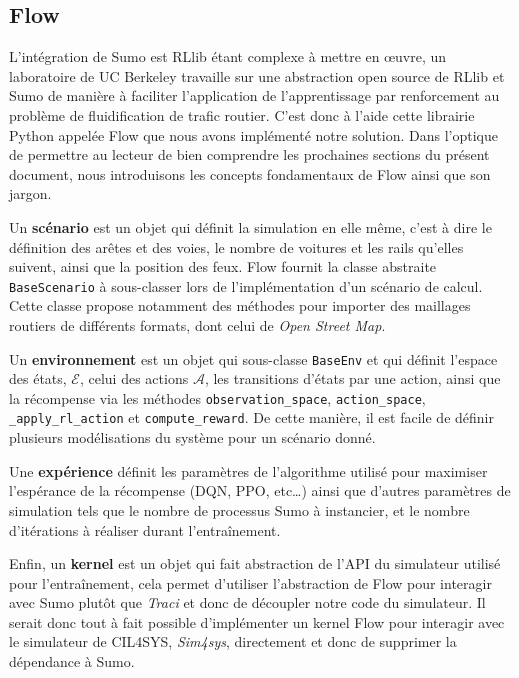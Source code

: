 \documentclass[11pt]{article}
\begin{document}
\subsection{Flow}
\label{sec:org7b30e6a}

L'intégration de Sumo est RLlib étant complexe à mettre en œuvre, un laboratoire de UC Berkeley travaille sur une abstraction open source de RLlib et Sumo de manière à faciliter l'application de l'apprentissage par renforcement au problème de fluidification de trafic routier. C'est donc à l'aide cette librairie Python appelée Flow que nous avons implémenté notre solution. Dans l'optique de permettre au lecteur de bien comprendre les prochaines sections du présent document, nous introduisons les concepts fondamentaux de Flow ainsi que son jargon.

Un \textbf{scénario} est un objet qui définit la simulation en elle même, c'est à dire le définition des arêtes et des voies, le nombre de voitures et les rails qu'elles suivent, ainsi que la position des feux. Flow fournit la classe abstraite \texttt{BaseScenario} à sous-classer lors de l'implémentation d'un scénario de calcul. Cette classe propose notamment des méthodes pour importer des maillages routiers de différents formats, dont celui de \emph{Open Street Map}.

Un \textbf{environnement} est un objet qui sous-classe \texttt{BaseEnv} et qui définit l'espace des états, \(\mathcal{E}\), celui des actions \(\mathcal{A}\), les transitions d'états par une action, ainsi que la récompense via les méthodes \texttt{observation\_space}, \texttt{action\_space}, \texttt{\_apply\_rl\_action} et \texttt{compute\_reward}. De cette manière, il est facile de définir plusieurs modélisations du système pour un scénario donné.

Une \textbf{expérience} définit les paramètres de l'algorithme utilisé pour maximiser l'espérance de la récompense (DQN, PPO, etc…) ainsi que d'autres paramètres de simulation tels que le nombre de processus Sumo à instancier, et le nombre d'itérations à réaliser durant l'entraînement.

Enfin, un \textbf{kernel} est un objet qui fait abstraction de l'API du simulateur utilisé pour l'entraînement, cela permet d'utiliser l'abstraction de Flow pour interagir avec Sumo plutôt que \emph{Traci} et donc de découpler notre code du simulateur. Il serait donc tout à fait possible d'implémenter un kernel Flow pour interagir avec le simulateur de CIL4SYS, \emph{Sim4sys}, directement et donc de supprimer la dépendance à Sumo.
\end{document}
